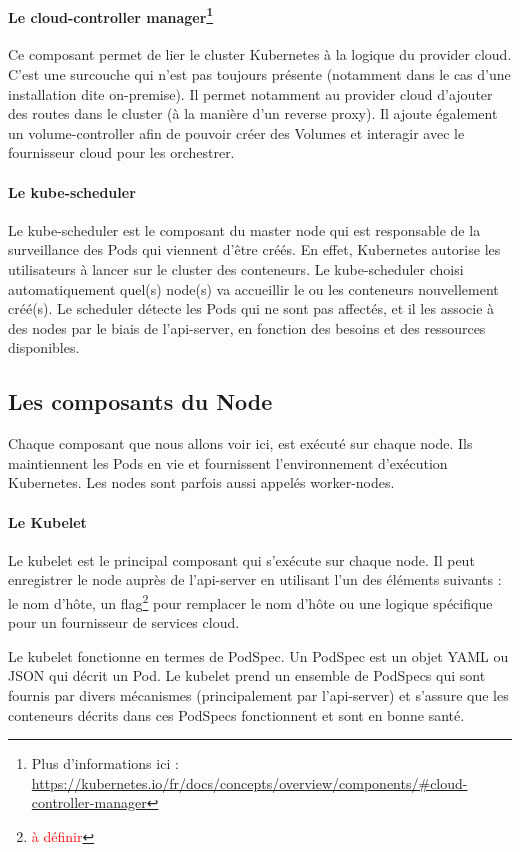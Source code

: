 \documentclass[11pt,fleqn]{book} %
\begin{document}
\paragraph{Le cloud-controller manager\footnote{Plus d'informations ici : \url{https://kubernetes.io/fr/docs/concepts/overview/components/\#cloud-controller-manager}}}
Ce composant permet de lier le cluster Kubernetes à la logique du provider cloud. C'est une surcouche qui n'est pas toujours présente (notamment dans le cas d'une installation dite on-premise). Il permet notamment au provider cloud d'ajouter des routes dans le cluster (à la manière d'un reverse proxy). Il ajoute également un volume-controller afin de pouvoir créer des Volumes et interagir avec le fournisseur cloud pour les orchestrer.

\paragraph{Le kube-scheduler}
Le kube-scheduler est le composant du master node qui est responsable de la surveillance des Pods qui viennent d'être créés. En effet, Kubernetes autorise les utilisateurs à lancer sur le cluster des conteneurs. Le kube-scheduler choisi automatiquement quel(s) node(s) va accueillir le ou les conteneurs nouvellement créé(s). Le scheduler détecte les Pods qui ne sont pas affectés, et il les associe à des nodes par le biais de l'api-server, en fonction des besoins et des ressources disponibles.

\subsection{Les composants du Node}
Chaque composant que nous allons voir ici, est exécuté sur chaque node. Ils maintiennent les Pods en vie et fournissent l'environnement d'exécution Kubernetes. Les nodes sont parfois aussi appelés worker-nodes.

\paragraph{Le Kubelet}
Le kubelet est le principal composant qui s'exécute sur chaque node. Il peut enregistrer le node auprès de l'api-server en utilisant l'un des éléments suivants : le nom d'hôte, un flag\footnote{\textcolor{red}{à définir}} pour remplacer le nom d'hôte ou une logique spécifique pour un fournisseur de services cloud.

Le kubelet fonctionne en termes de PodSpec. Un PodSpec est un objet YAML ou JSON qui décrit un Pod. Le kubelet prend un ensemble de PodSpecs qui sont fournis par divers mécanismes (principalement par l'api-server) et s'assure que les conteneurs décrits dans ces PodSpecs fonctionnent et sont en bonne santé.
\end{document}
